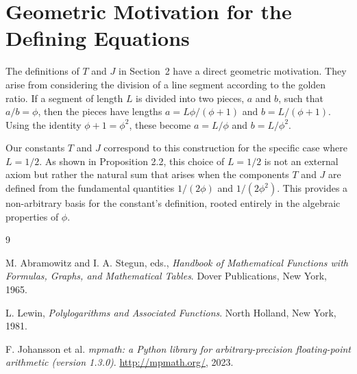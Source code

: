 \documentclass{amsart}
\theoremstyle{plain}
\theoremstyle{definition}
\theoremstyle{remark}
\begin{document}
\appendix
\section{Geometric Motivation for the Defining Equations}
\label{app:A}
The definitions of $T$ and $J$ in Section~2 have a direct geometric motivation. They arise from considering the division of a line segment according to the golden ratio. If a segment of length $L$ is divided into two pieces, $a$ and $b$, such that $a/b = \phi$, then the pieces have lengths $a = L\phi/(\phi+1)$ and $b=L/(\phi+1)$. Using the identity $\phi+1=\phi^2$, these become $a=L/\phi$ and $b=L/\phi^2$.

Our constants $T$ and $J$ correspond to this construction for the specific case where $L=1/2$. As shown in Proposition 2.2, this choice of $L=1/2$ is not an external axiom but rather the natural sum that arises when the components $T$ and $J$ are defined from the fundamental quantities $1/(2\phi)$ and $1/(2\phi^2)$. This provides a non-arbitrary basis for the constant's definition, rooted entirely in the algebraic properties of $\phi$.

\begin{thebibliography}{9}

M. Abramowitz and I. A. Stegun, eds.,
\textit{Handbook of Mathematical Functions with Formulas, Graphs, and Mathematical Tables}.
Dover Publications, New York, 1965.

L. Lewin,
\textit{Polylogarithms and Associated Functions}.
North Holland, New York, 1981.

F. Johansson et al.
\textit{mpmath: a Python library for arbitrary-precision floating-point arithmetic (version 1.3.0)}.
\url{http://mpmath.org/}, 2023.

\end{thebibliography}
\end{document}
